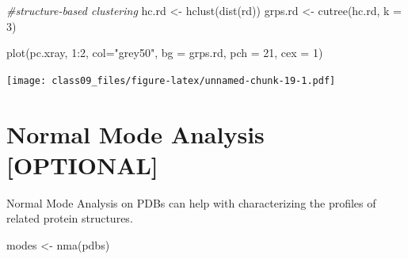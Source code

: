 \documentclass[
]{article}
\newenvironment{Shaded}{\begin{snugshade}}{\end{snugshade}}
\newcommand{\AttributeTok}[1]{\textcolor[rgb]{0.77,0.63,0.00}{#1}}
\newcommand{\CommentTok}[1]{\textcolor[rgb]{0.56,0.35,0.01}{\textit{#1}}}
\newcommand{\DecValTok}[1]{\textcolor[rgb]{0.00,0.00,0.81}{#1}}
\newcommand{\FunctionTok}[1]{\textcolor[rgb]{0.00,0.00,0.00}{#1}}
\newcommand{\NormalTok}[1]{#1}
\newcommand{\OtherTok}[1]{\textcolor[rgb]{0.56,0.35,0.01}{#1}}
\newcommand{\SpecialCharTok}[1]{\textcolor[rgb]{0.00,0.00,0.00}{#1}}
\newcommand{\StringTok}[1]{\textcolor[rgb]{0.31,0.60,0.02}{#1}}
\begin{document}
\begin{Shaded}
\begin{Highlighting}[]
\CommentTok{\#structure{-}based clustering}
\NormalTok{hc.rd }\OtherTok{\textless{}{-}} \FunctionTok{hclust}\NormalTok{(}\FunctionTok{dist}\NormalTok{(rd))}
\NormalTok{grps.rd }\OtherTok{\textless{}{-}} \FunctionTok{cutree}\NormalTok{(hc.rd, }\AttributeTok{k =} \DecValTok{3}\NormalTok{)}

\FunctionTok{plot}\NormalTok{(pc.xray, }\DecValTok{1}\SpecialCharTok{:}\DecValTok{2}\NormalTok{, }\AttributeTok{col=}\StringTok{"grey50"}\NormalTok{, }\AttributeTok{bg =}\NormalTok{ grps.rd, }\AttributeTok{pch =} \DecValTok{21}\NormalTok{, }\AttributeTok{cex =} \DecValTok{1}\NormalTok{)}
\end{Highlighting}
\end{Shaded}

\texttt{[image: class09\_files/figure-latex/unnamed-chunk-19-1.pdf]}

\hypertarget{normal-mode-analysis-optional}{%
\section{Normal Mode Analysis
{[}OPTIONAL{]}}\label{normal-mode-analysis-optional}}

Normal Mode Analysis on PDBs can help with characterizing the profiles
of related protein structures.

\begin{Shaded}
\begin{Highlighting}[]
\NormalTok{modes }\OtherTok{\textless{}{-}} \FunctionTok{nma}\NormalTok{(pdbs)}
\end{Highlighting}
\end{Shaded}
\end{document}
